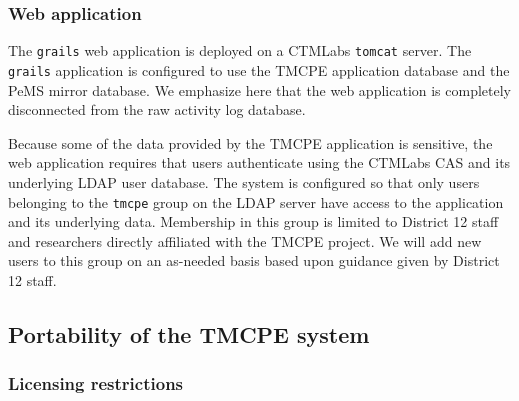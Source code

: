 \documentclass[12pt]{report}
\begin{document}
\subsubsection{Web application}
\label{sec:web-app}

The \texttt{grails} web application is deployed on a \ac{CTMLabs}
\texttt{tomcat} server.  The \texttt{grails} application is configured to use
the \ac{TMCPE} application database and the \ac{PeMS} mirror database.  We
emphasize here that the web application is completely disconnected from the raw
activity log database.  

Because some of the data provided by the \ac{TMCPE} application is sensitive,
the web application requires that users authenticate using the \ac{CTMLabs}
\acf{CAS} and its underlying \ac{LDAP} user database.  The system is configured
so that only users belonging to the \texttt{tmcpe} group on the \ac{LDAP} server
have access to the application and its underlying data.  Membership in this
group is limited to District 12 staff and researchers directly affiliated with the
\ac{TMCPE} project.  We will add new users to this group on an as-needed basis
based upon guidance given by District 12 staff.


\subsection{Portability of the TMCPE system}
\label{sec:portability}

\subsubsection{Licensing restrictions}
\label{sec:portability-licensing}
\end{document}
